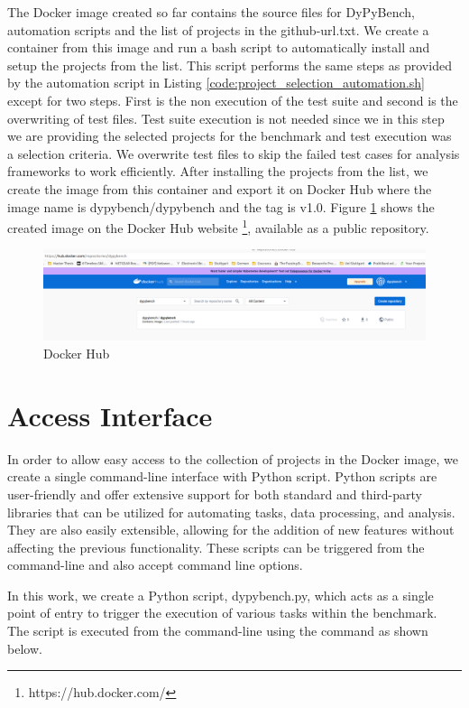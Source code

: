 The Docker image created so far contains the source files for DyPyBench, automation scripts and the list of projects in the github-url.txt.
We create a container from this image and run a bash script to automatically install and setup the projects from the list.
This script performs the same steps as provided by the automation script in Listing \ref{code:project_selection_automation.sh} except for two steps.
First is the non execution of the test suite and second is the overwriting of test files.
Test suite execution is not needed since we in this step we are providing the selected projects for the benchmark and test execution was a selection criteria.
We overwrite test files to skip the failed test cases for analysis frameworks to work efficiently. 
After installing the projects from the list, we create the image from this container and export it on Docker Hub where the image name is dypybench/dypybench and the tag is v1.0.
Figure \ref{fig:dypybench docker} shows the created image on the Docker Hub website \footnote{https://hub.docker.com/}, available as a public repository.

\begin{figure}[ht]
\centering
\includegraphics[width=1\linewidth]{figures/implementation/docker_hub.png}
\caption[DyPyBench Docker Hub]{\label{fig:dypybench docker}Docker Hub}
\end{figure}

\section{Access Interface}
\label{impl:Access Interface}
In order to allow easy access to the collection of projects in the Docker image, we create a single command-line interface with Python script.
Python scripts are user-friendly and offer extensive support for both standard and third-party libraries that can be utilized for automating tasks, data processing, and analysis.
They are also easily extensible, allowing for the addition of new features without affecting the previous functionality.
These scripts can be triggered from the command-line and also accept command line options.

In this work, we create a Python script, dypybench.py, which acts as a single point of entry to trigger the execution of various tasks within the benchmark.
The script is executed from the command-line using the command as shown below.

